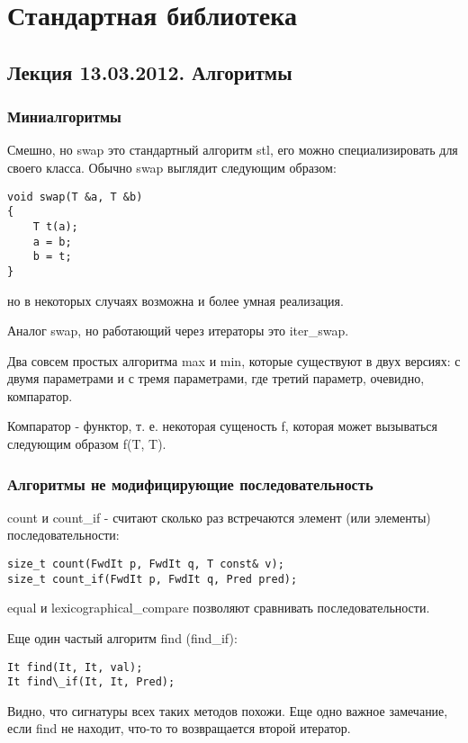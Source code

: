 \chapter{Стандартная библиотека}

\section{Лекция 13.03.2012. Алгоритмы}

\subsection{Миниалгоритмы}

Смешно, но swap это стандартный алгоритм stl, его можно специализировать для своего класса. Обычно swap выглядит следующим образом:
\begin{lstlisting}
void swap(T &a, T &b)
{
	T t(a);
	a = b;
	b = t;
}
\end{lstlisting}

но в некоторых случаях возможна и более умная реализация.

Аналог swap, но работающий через итераторы это iter\_swap.

Два совсем простых алгоритма max и min, которые существуют в двух версиях: с двумя параметрами и с тремя параметрами, где третий параметр, очевидно, компаратор.

Компаратор - функтор, т. е. некоторая сущеность f, которая может вызываться следующим образом f(T, T).

\subsection{Алгоритмы не модифицирующие последовательность}

count и count\_if - считают сколько раз встречаются элемент (или элементы) последовательности:
\begin{lstlisting}
size_t count(FwdIt p, FwdIt q, T const& v);
size_t count_if(FwdIt p, FwdIt q, Pred pred);
\end{lstlisting}

equal и lexicographical\_compare позволяют сравнивать последовательности.

Еще один частый алгоритм find (find\_if):
\begin{lstlisting}
It find(It, It, val);
It find\_if(It, It, Pred);
\end{lstlisting}

Видно, что сигнатуры всех таких методов похожи. Еще одно важное замечание, если find не находит, что-то то возвращается второй итератор.

